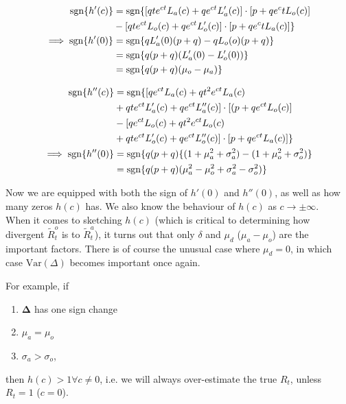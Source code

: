 \documentclass[10pt,journal,compsoc]{IEEEtran}
\begin{document}
\begin{align*}
\mathrm{sgn} \{ h'(c)\} &= \mathrm{sgn} \{\Large[qte^{ct}L_a(c) +qe^{ct}L_a'(c)\Large] \cdot \Large[ p+q e^ct L_o(c) \Large] \\ 
&- \Large[qte^{ct}L_o(c) +qe^{ct}L_o'(c)\Large] \cdot \Large[ p+q e^ct L_a(c) \Large] \}\\
\implies \mathrm{sgn} \{ h'(0)\}&= \mathrm{sgn} \{qL_a'(0)(p+q)-qL_o(o)(p+q) \}\\
&= \mathrm{sgn} \{ q(p+q)\Large( L_a'(0) - L_o'(0)\Large) \}\\
&= \mathrm{sgn} \{ q(p+q)(\mu_o-\mu_a) \}
\end{align*}

\begin{equation*}
\begin{split}
\mathrm{sgn} \{ h''(c)\} &= \mathrm{sgn} \{\Large[ qe^{ct}L_a(c)+qt^2e^{ct}L_a(c)\\
&+ qte^{ct}L_a'(c)+qe^{ct}L_a''(c) \Large] \cdot \Large[(p+qe^{ct}L_o(c) \Large]\\ 
&- \Large[ qe^{ct}L_o(c)+qt^2e^{ct}L_o(c)\\
&+ qte^{ct}L_o'(c)+qe^{ct}L_o''(c) \Large] \cdot \Large[p+qe^{ct}L_a(c) \Large] \} \\
\implies \mathrm{sgn} \{ h''(0)\}&= \mathrm{sgn} \{q(p+q)\{ \Large(1+ \mu_a^2 +\sigma_a^2 \Large) - \Large( 1+ \mu_o^2 +\sigma_o^2 \Large) \}\\
&= \mathrm{sgn} \{q(p+q)(\mu^2_a-\mu_o^2 + \sigma_a^2 -\sigma_o^2) \}
\end{split}
\end{equation*}

Now we are equipped with both the sign of $h'(0)$ and $h''(0)$, as well as how many zeros $h(c)$ has. We also know the behaviour of $h(c)$ as $c \rightarrow \pm \infty$.\\
When it comes to sketching $h(c)$ (which is critical to determining how divergent $\tilde{R}_t^o$ is to $\tilde{R}_t^a$), it turns out that only $\delta$ and $\mu_d$ ($\mu_a- \mu_o$) are the important factors. There is of course the unusual case where $\mu_d=0$, in which case $\mathrm{Var}(\Delta)$ becomes important once again.

For example, if 
\begin{enumerate}
    \item $\boldsymbol{\Delta}$ has one sign change
    \item $\mu_a =\mu_o$
    \item $\sigma_a > \sigma_o$,
\end{enumerate}
then $h(c)>1 \forall c \ne 0$, i.e. we will always over-estimate the true $R_t$, unless $R_t = 1$ ($c=0$).\\
\end{document}
